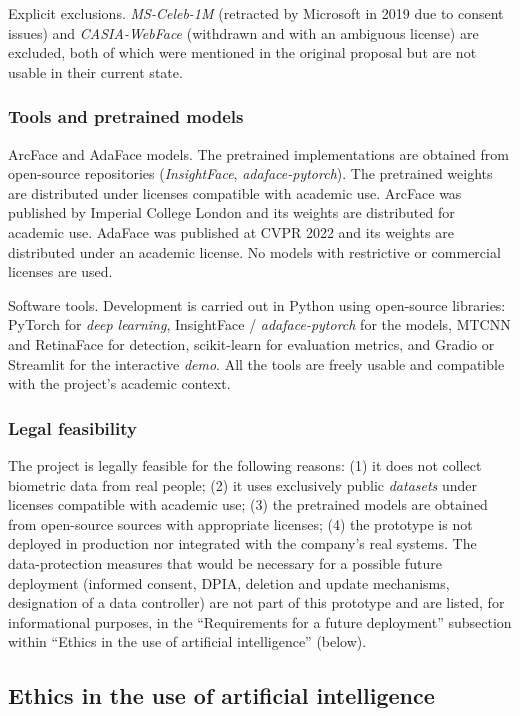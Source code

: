 \documentclass[
  11pt, %
]{charter}
\begin{document}
Explicit exclusions. \textit{MS-Celeb-1M} (retracted by Microsoft in 2019 due to consent issues) and \textit{CASIA-WebFace} (withdrawn and with an ambiguous license) are excluded, both of which were mentioned in the original proposal but are not usable in their current state.

\subsubsection{Tools and pretrained models}

ArcFace and AdaFace models. The pretrained implementations are obtained from open-source repositories (\textit{InsightFace}, \textit{adaface-pytorch}). The pretrained weights are distributed under licenses compatible with academic use. ArcFace was published by Imperial College London and its weights are distributed for academic use. AdaFace was published at CVPR 2022 and its weights are distributed under an academic license. No models with restrictive or commercial licenses are used.

Software tools. Development is carried out in Python using open-source libraries: PyTorch for \textit{deep learning}, InsightFace / \textit{adaface-pytorch} for the models, MTCNN and RetinaFace for detection, scikit-learn for evaluation metrics, and Gradio or Streamlit for the interactive \textit{demo}. All the tools are freely usable and compatible with the project's academic context.

\subsubsection{Legal feasibility}

The project is legally feasible for the following reasons: (1) it does not collect biometric data from real people; (2) it uses exclusively public \textit{datasets} under licenses compatible with academic use; (3) the pretrained models are obtained from open-source sources with appropriate licenses; (4) the prototype is not deployed in production nor integrated with the company's real systems. The data-protection measures that would be necessary for a possible future deployment (informed consent, DPIA, deletion and update mechanisms, designation of a data controller) are not part of this prototype and are listed, for informational purposes, in the ``Requirements for a future deployment'' subsection within ``Ethics in the use of artificial intelligence'' (below).

\subsection{Ethics in the use of artificial intelligence}
\end{document}
